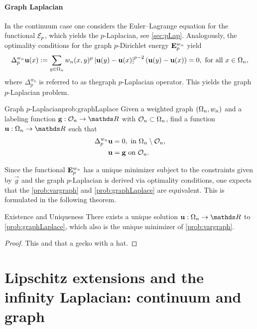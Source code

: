 \paragraph{Graph Laplacian}
%
In the continuum case one considers the Euler--Lagrange equation for the functional $\mathcal{E}_p$, which yields the 
$p$-Laplacian, see \cref{sec:pLap}. Analogously, the optimality conditions for the graph $p$-Dirichlet energy $\mathbf{E}^{w_n}_p$ yield
%
\begin{align*}
\Delta^{w_n}_p \mathbf{u}(x):= \sum_{y\in\Omega_n} w_n(x,y)^p \left|\mathbf{u}(y) - \mathbf{u}(x)\right|^{p-2} \left( \mathbf{u}(y) - \mathbf{u}(x) \right) = 0, 
\text{ for all } x\in\Omega_n,
\end{align*}
%
where $\Delta^{w_n}_p$ is referred to as thegraph $p$-Laplacian operator. This yields the graph $p$-Laplacian problem.
%
\begin{problem}{Graph $p$-Laplacian}{prob:graphLaplace}
Given a weighted graph $(\Omega_n, w_n)$ and a labeling function $\vec g:\conset_n\to\R$ with $\mathcal{O}_n\subset\Omega_n$, find 
a function $\vec u:\domain_n\to\R$ such that
%
\begin{align*}
\Delta_p^{w_n} \mathbf{u} &= 0, \text{ in } \Omega_n\setminus \mathcal{O}_n,\\
\mathbf{u} &= \mathbf{g} \text{ on } \mathcal{O}_n.
\end{align*}
\end{problem}
%
Since the functional $\mathbf{E}^{w_n}_p$ has a unique minimizer subject to the constraints given by $\vec g$ and the graph $p$-Laplacian is derived 
via optimality conditions, one expects that the \cref{prob:vargraph} and \cref{prob:graphLaplace} are equivalent. This is formulated in the following 
theorem.
%
\begin{theorem}{Existence and Uniqueness}{}
There exists a unique solution $\vec u:\domain_n\to\R$ to \cref{prob:graphLaplace}, which also is the unique minimizer 
of \cref{prob:vargraph}.
\end{theorem}
%
\begin{proof}
This and that a gecko with a hat.
\end{proof}
%
%
%
%
%
%
%
%
%
%
%
%
%
%
\section{Lipschitz extensions and the infinity Laplacian: continuum and graph}\label{sec:LipExt}
%
%
